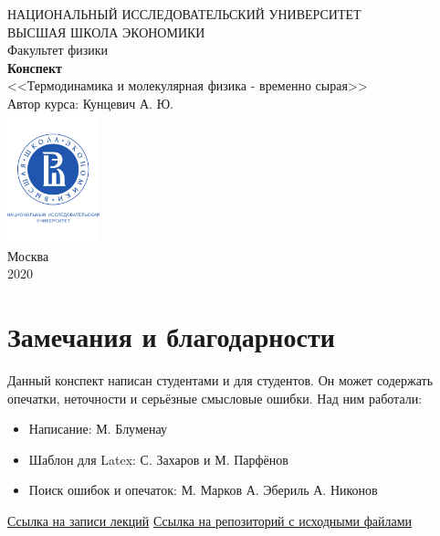 \documentclass[a4paper, 12pt]{article}
\begin{document}
	\begin{titlepage}
		\begin{center}
			$$$$
			$$$$
			$$$$
			$$$$
			{\Large{НАЦИОНАЛЬНЫЙ ИССЛЕДОВАТЕЛЬСКИЙ УНИВЕРСИТЕТ}}\\
			\vspace{0.1cm}
			{\Large{ВЫСШАЯ ШКОЛА ЭКОНОМИКИ}}\\
			\vspace{0.25cm}
			{\large{Факультет физики}}\\
			\vspace{5.5cm}
			{\Huge\textbf{{Конспект}}}\\%
			\vspace{1cm}
			{\LARGE{<<Термодинамика и молекулярная физика - временно сырая>>}}\\%
			\vspace{1cm}
			{\LARGE{Автор курса: Кунцевич А. Ю.}}\\%
			\vspace{2cm}
			\vfill
			\includegraphics[width = 0.2\textwidth]{HSElogo}\\
			\vfill
			Москва\\
			2020
		\end{center}
	\end{titlepage}
	
	\tableofcontents
	\newpage
	\section*{Замечания и благодарности}
	Данный конспект написан студентами и для студентов. Он может содержать опечатки, неточности и серьёзные смысловые ошибки.
	Над ним работали:
	\begin{itemize}
		\item Написание:
		\subitem М. Блуменау 
		\item Шаблон для Latex:
		\subitem С. Захаров и М. Парфёнов
		\item Поиск ошибок и опечаток:
		\subitem М. Марков
		\subitem А. Эбериль
		\subitem А. Никонов
	\end{itemize}
	\href{https://drive.google.com/drive/folders/1YxoCMlbHhKd1kKbX7nwRKx5jfchXqmVf?usp=sharing}{Ссылка на записи лекций} 
	\newline
	\href{https://github.com/burunduk387/HSE-FF/tree/main/Thermodynamics}{Ссылка на репозиторий с исходными файлами} 
	\newpage
\end{document}

